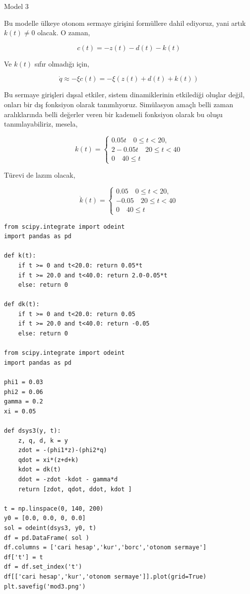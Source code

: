 \documentclass[12pt,fleqn]{article}\usepackage{../../common}
\begin{document}
Model 3

Bu modelle ülkeye otonom sermaye girişini formüllere dahil ediyoruz, yani
artık $k(t) \ne 0$ olacak. O zaman,

$$
c(t) = -z(t) - d(t) - k(t)
$$

Ve $k(t)$ sıfır olmadığı için,

$$
\dot{q} \approx -\xi c(t) = -\xi (z(t) + d(t) + k(t))
$$

Bu sermaye girişleri dışsal etkiler, sistem dinamiklerinin etkilediği
oluşlar değil, onları bir dış fonksiyon olarak tanımlıyoruz. Simülasyon
amaçlı belli zaman aralıklarında belli değerler veren bir kademeli
fonksiyon olarak bu oluşu tanımlayabiliriz, mesela,

$$
k(t) = \left\{ \begin{array}{l}
0.05 t \quad 0 \le t < 20,  \\
2 -0.05t \quad  20 \le t < 40 \\
0 \quad 40 \le t 	
\end{array} \right.
$$

Türevi de lazım olacak, 

$$
\dot{k}(t) = \left\{ \begin{array}{l}
0.05  \quad 0 \le t < 20,  \\
-0.05 \quad  20 \le t < 40 \\
0 \quad 40 \le t 	
\end{array} \right.
$$

\begin{verbatim}
from scipy.integrate import odeint
import pandas as pd

def k(t):
    if t >= 0 and t<20.0: return 0.05*t
    if t >= 20.0 and t<40.0: return 2.0-0.05*t
    else: return 0

def dk(t):
    if t >= 0 and t<20.0: return 0.05 
    if t >= 20.0 and t<40.0: return -0.05
    else: return 0

from scipy.integrate import odeint
import pandas as pd

phi1 = 0.03
phi2 = 0.06
gamma = 0.2
xi = 0.05

def dsys3(y, t):
    z, q, d, k = y
    zdot = -(phi1*z)-(phi2*q)
    qdot = xi*(z+d+k)
    kdot = dk(t)    
    ddot = -zdot -kdot - gamma*d
    return [zdot, qdot, ddot, kdot ]

t = np.linspace(0, 140, 200)
y0 = [0.0, 0.0, 0, 0.0]
sol = odeint(dsys3, y0, t)
df = pd.DataFrame( sol )
df.columns = ['cari hesap','kur','borc','otonom sermaye']
df['t'] = t
df = df.set_index('t')
df[['cari hesap','kur','otonom sermaye']].plot(grid=True)
plt.savefig('mod3.png')
\end{verbatim}
\end{document}
